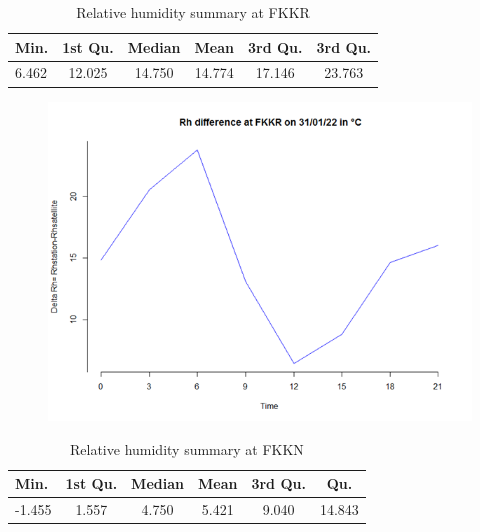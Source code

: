 \newpage


\begin{table}[H]
\caption{Relative humidity summary at FKKR}
\label{tab:Temperature  summary at FKKR}
\begin{center}
\begin{tabular}{| l | c | c |c |c |c |}
\hline
\textbf{\small{Min.}} & \textbf{\small{1st Qu.}} & \textbf{\small{Median}}& \textbf{\small{Mean}} & \textbf{\small{3rd Qu.}} & \textbf{\small{3rd Qu.}}\\[2pt] \hline

\small{6.462}& \small{12.025}& \small{14.750}& \small{14.774}&  \small{17.146}& \small{23.763} \\ \hline

\end{tabular}
\end{center}
\end{table}

\begin{figure}[H]
\begin{center}
\includegraphics[scale=0.6]{rhh1.png} %
\end{center}
\end{figure}




\begin{table}[H]
\caption{Relative humidity  summary at FKKN}
\label{tab:Temperature summary at FKKN}
\begin{center}
\begin{tabular}{| l | c | c |c |c |c |}
\hline
\textbf{\small{Min.}} & \textbf{\small{1st Qu.}} & \textbf{\small{Median}}& \textbf{\small{Mean}} & \textbf{3\small{rd Qu.}} & \textbf{\small{ Qu.}}\\[2pt] \hline

\small{-1.455}& \small{1.557}& \small{4.750} & \small{5.421}& \small{9.040} & \small{14.843} \\ \hline

\end{tabular}
\end{center}
\end{table}


